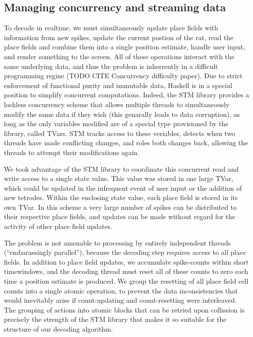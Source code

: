 \documentclass[10pt]{article}
\begin{document}
\subsection*{Managing concurrency and streaming data}

To decode in realtime, we must simultaneously update place fields with information from new spikes, update the current postion of the rat, read the place fields and combine them into a single position estimate, handle user input, and render something to the screen. All of these operations interact with the same underlying data, and thus the problem is inherrently in a difficult programming regine (TODO CITE Concurrency difficulty paper). Due to strict enforcement of functional purity and immutable data, Haskell is in a special position to simplify concurrent computations. Indeed, the STM library provides a lockless concurrency scheme that allows multiple threads to simultaneously modify the same data if they wish (this genarally leads to data corruption), as long as the only variables modified are of a special type provisioned by the library, called TVars. STM tracks access to these veriables, detects when two threads have made conflicting changes, and roles both changes back, allowing the threads to attempt their modifications again.

We took advantage of the STM library to coordinate this concurrent read and write access to a single state value. This value was stored in one large TVar, which could be updated in the infrequent event of user input or the addition of new tetrodes. Within the enclosing state value, each place field is stored in its own TVar. In this scheme a very large number of spikes can be distributed to their respective place fields, and updates can be made without regard for the activity of other place field updates.

The problem is not amenable to processing by entirely independent threads (``embarassingly parallel''), because the decoding step requires access to all place fields. In addition to place field updates, we accumulate spike-counts within short timewindows, and the decoding thread must reset all of these counts to zero each time a position estimate is produced. We group the resetting of all place field cell counts into a single atomic operation, to prevent the data inconsistencies that would inevitably arise if count-updating and count-resetting were interleaved. The grouping of actions into atomic blocks that can be retried upon collission is precisely the strength of the STM library that makes it so suitable for the structure of our decoding algorithm.
\end{document}
